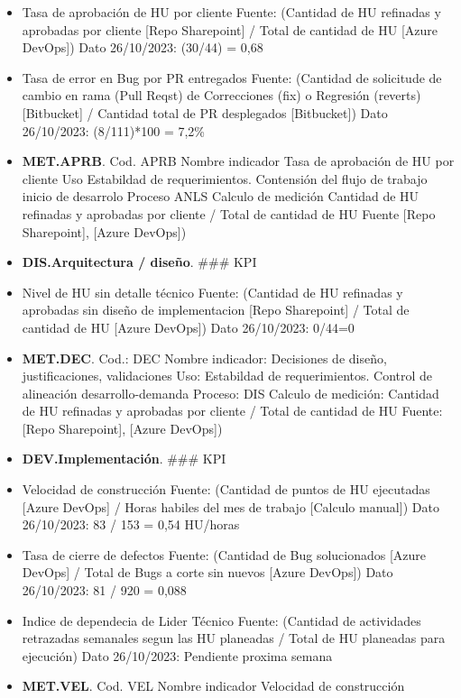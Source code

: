 \documentclass[
  paper=a4,
  ,captions=tableheading
]{scrartcl}
\begin{document}
\begin{itemize}
\item
  Tasa de aprobación de HU por cliente Fuente: (Cantidad de HU refinadas
  y aprobadas por cliente {[}Repo Sharepoint{]} / Total de cantidad de
  HU {[}Azure DevOps{]}) Dato 26/10/2023: (30/44) = 0,68
\item
  Tasa de error en Bug por PR entregados Fuente: (Cantidad de solicitude
  de cambio en rama (Pull Reqst) de Correcciones (fix) o Regresión
  (reverts) {[}Bitbucket{]} / Cantidad total de PR desplegados
  {[}Bitbucket{]}) Dato 26/10/2023: (8/111)*100 = 7,2\%
\item
  \textbf{MET.APRB}. Cod. APRB Nombre indicador Tasa de aprobación de HU
  por cliente Uso Estabildad de requerimientos. Contensión del flujo de
  trabajo inicio de desarrolo Proceso ANLS Calculo de medición Cantidad
  de HU refinadas y aprobadas por cliente / Total de cantidad de HU
  Fuente {[}Repo Sharepoint{]}, {[}Azure DevOps{]})
\item
  \textbf{DIS.Arquitectura / diseño}. \#\#\# KPI
\item
  Nivel de HU sin detalle técnico Fuente: (Cantidad de HU refinadas y
  aprobadas sin diseño de implementacion {[}Repo Sharepoint{]} / Total
  de cantidad de HU {[}Azure DevOps{]}) Dato 26/10/2023: 0/44=0
\item
  \textbf{MET.DEC}. Cod.: DEC Nombre indicador: Decisiones de diseño,
  justificaciones, validaciones Uso: Estabildad de requerimientos.
  Control de alineación desarrollo-demanda Proceso: DIS Calculo de
  medición: Cantidad de HU refinadas y aprobadas por cliente / Total de
  cantidad de HU Fuente: {[}Repo Sharepoint{]}, {[}Azure DevOps{]})
\item
  \textbf{DEV.Implementación}. \#\#\# KPI
\item
  Velocidad de construcción Fuente: (Cantidad de puntos de HU ejecutadas
  {[}Azure DevOps{]} / Horas habiles del mes de trabajo {[}Calculo
  manual{]}) Dato 26/10/2023: 83 / 153 = 0,54 HU/horas
\item
  Tasa de cierre de defectos Fuente: (Cantidad de Bug solucionados
  {[}Azure DevOps{]} / Total de Bugs a corte sin nuevos {[}Azure
  DevOps{]}) Dato 26/10/2023: 81 / 920 = 0,088
\item
  Indice de dependecia de Lider Técnico Fuente: (Cantidad de actividades
  retrazadas semanales segun las HU planeadas / Total de HU planeadas
  para ejecución) Dato 26/10/2023: Pendiente proxima semana
\item
  \textbf{MET.VEL}. Cod. VEL Nombre indicador Velocidad de construcción

\end{itemize}
\end{document}
